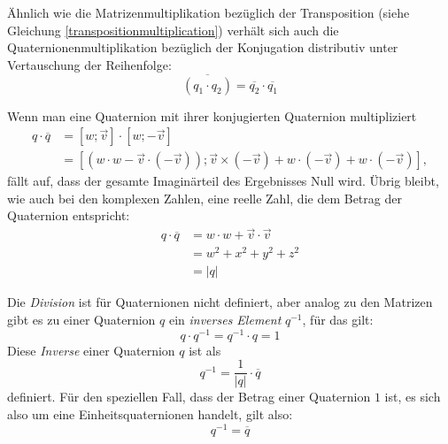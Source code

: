 Ähnlich wie die Matrizenmultiplikation bezüglich der Transposition (siehe Gleichung \ref{transpositionmultiplication}) verhält sich auch die Quaternionenmultiplikation bezüglich der Konjugation distributiv unter Vertauschung der Reihenfolge:
\begin{equation}
 \label{quaternionconjugationmultiplication}
 \overline{( q_1 \cdot q_2 )} = \overline{q_2} \cdot \overline{q_1}
\end{equation} 

Wenn man eine Quaternion mit ihrer konjugierten Quaternion multipliziert
\begin{equation}
\begin{split}
 q \cdot \overline{q} &= \left[ w; \vec v \right] \cdot \left[ w; -\vec v \right] \\
 & = \left[ \left( w \cdot w - \vec{v} \cdot (-\vec{v}) \right); \vec{v} \times (-\vec{v}) + w \cdot (-\vec{v}) + w \cdot (-\vec{v}) \right],
\end{split}
\end{equation}
fällt auf, dass der gesamte Imaginärteil des Ergebnisses Null wird. Übrig bleibt, wie auch bei den komplexen Zahlen, eine reelle Zahl, die dem Betrag der Quaternion entspricht:
\begin{equation}
\begin{split}
 q \cdot \overline{q} &= w \cdot w + \vec v \cdot \vec v \\
 &= w^2 + x^2 + y^2 + z^2 \\
 &= \left| q \right|
\end{split}
\end{equation}

Die \emph{Division} ist für Quaternionen nicht definiert, aber analog zu den Matrizen gibt es zu einer Quaternion $q$ ein \emph{inverses Element} $q^{-1}$, für das gilt:
\begin{equation}
 q \cdot q^{-1} = q^{-1} \cdot q = 1
\end{equation}
Diese \emph{Inverse} einer Quaternion $q$ ist als
\begin{equation}
 q^{-1} = \frac{1}{\left| q \right|} \cdot \overline{q}
\end{equation}
definiert. Für den speziellen Fall, dass der Betrag einer Quaternion $1$ ist, es sich also um eine Einheitsquaternionen handelt, gilt also:
\begin{equation}
 q^{-1} = \overline{q}
\end{equation}